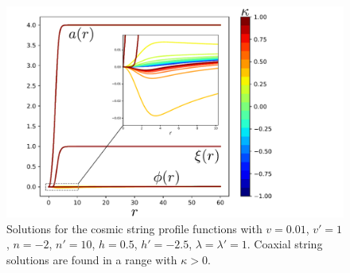 
%
%

\begin{figure}
	\centering
	\includegraphics[scale=1]{./figures/n-2h05np10hp-25l1lp1v001vp1combined.pdf}
	\caption{Solutions for the cosmic string profile functions with $v = 0.01$, $v'=1$, $n=-2$, $n'=10$, $h=0.5$, $h'=-2.5$, $\lambda=\lambda'=1$. Coaxial string solutions are found in a range with $\kappa>0$.}
	\label{fig:coaxial}
\end{figure}

